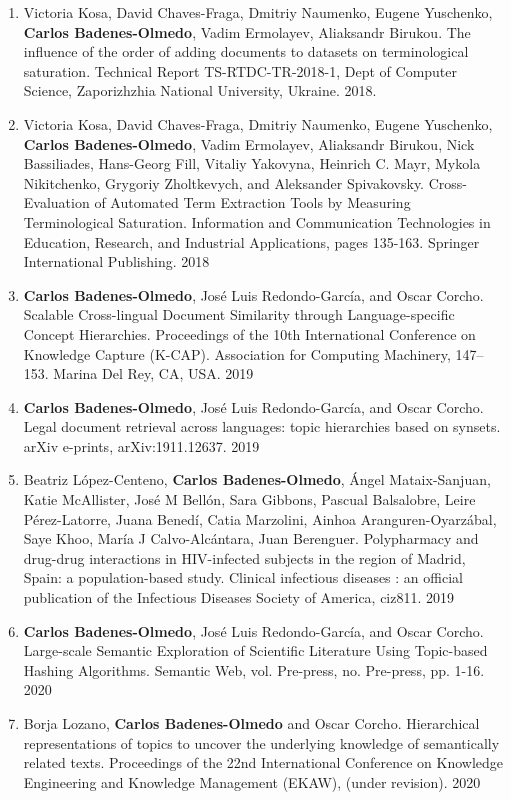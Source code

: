 \begin{enumerate}
\item Victoria Kosa, David Chaves-Fraga, Dmitriy Naumenko, Eugene Yuschenko, \textbf{Carlos Badenes-Olmedo}, Vadim Ermolayev, Aliaksandr Birukou. The influence of the order of adding documents to datasets on terminological saturation. Technical Report TS-RTDC-TR-2018-1, Dept of Computer Science, Zaporizhzhia National University, Ukraine. 2018.
\item Victoria Kosa, David Chaves-Fraga, Dmitriy Naumenko, Eugene Yuschenko, \textbf{Carlos Badenes-Olmedo}, Vadim Ermolayev, Aliaksandr Birukou, Nick Bassiliades, Hans-Georg Fill, Vitaliy Yakovyna, Heinrich C. Mayr, Mykola Nikitchenko, Grygoriy Zholtkevych, and Aleksander Spivakovsky. Cross-Evaluation of Automated Term Extraction Tools by Measuring Terminological Saturation. Information and Communication Technologies in Education, Research, and Industrial Applications, pages 135-163. Springer International Publishing. 2018
\item \textbf{Carlos Badenes-Olmedo}, José Luis Redondo-García, and Oscar Corcho. Scalable Cross-lingual Document Similarity through Language-specific Concept Hierarchies. Proceedings of the 10th International Conference on Knowledge Capture (K-CAP). Association for Computing Machinery, 147–153. Marina Del Rey, CA, USA. 2019
\item \textbf{Carlos Badenes-Olmedo}, José Luis Redondo-García, and Oscar Corcho. Legal document retrieval across languages: topic hierarchies based on synsets. arXiv e-prints, arXiv:1911.12637. 2019
\item Beatriz López-Centeno, \textbf{Carlos Badenes-Olmedo}, Ángel Mataix-Sanjuan, Katie McAllister, José M Bellón, Sara Gibbons, Pascual Balsalobre, Leire Pérez-Latorre, Juana Benedí, Catia Marzolini, Ainhoa Aranguren-Oyarzábal, Saye Khoo, María J Calvo-Alcántara, Juan Berenguer. Polypharmacy and drug-drug interactions in HIV-infected subjects in the region of Madrid, Spain: a population-based study. Clinical infectious diseases : an official publication of the Infectious Diseases Society of America, ciz811. 2019
\item \textbf{Carlos Badenes-Olmedo}, José Luis Redondo-García, and Oscar Corcho. Large-scale Semantic Exploration of Scientific Literature Using Topic-based Hashing Algorithms. Semantic Web, vol. Pre-press, no. Pre-press, pp. 1-16. 2020
\item Borja Lozano, \textbf{Carlos Badenes-Olmedo} and Oscar Corcho. Hierarchical representations of topics to uncover the underlying knowledge of semantically related texts. Proceedings of the 22nd International Conference on Knowledge Engineering and Knowledge Management (EKAW), (under revision). 2020

\end{enumerate}
